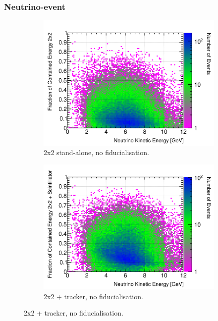 \documentclass[10pt,a4paper,openany]{article}
\begin{document}
\subsubsection{Neutrino-event}
\begin{figure}[htbp]
	\centering
	\begin{subfigure}[b]{0.49\textwidth}
		\centering
		\includegraphics[width=1.0\textwidth]{E_contained_frac_2x2.png}
		\caption{2x2 stand-alone, no fiducialisation.}
		\label{}
	\end{subfigure}	
	\hfill
	\begin{subfigure}[b]{0.49\textwidth}
		\centering
		\includegraphics[width=1.0\textwidth]{E_contained_frac_2x2_Scintillator_gap.png}
		\caption{2x2 + tracker, no fiducialisation.}
		\label{}

\end{subfigure}
\end{figure}
\end{document}
